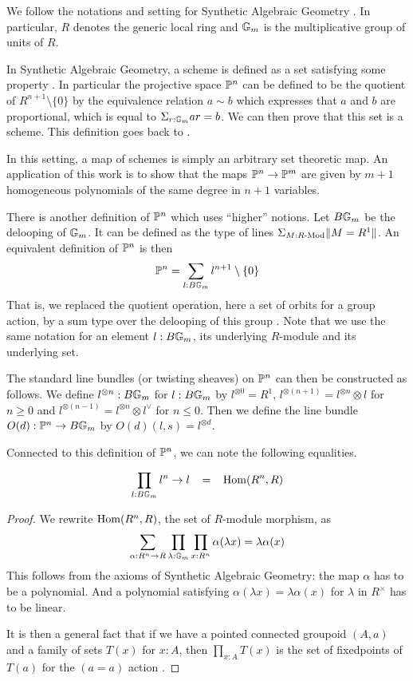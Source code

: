 We follow the notations and setting for Synthetic Algebraic Geometry \cite{draft}.
In particular, $R$ denotes the generic local ring and $\mathbb{G}_m$ is the multiplicative group of units of $R$.

In Synthetic Algebraic Geometry, a scheme is defined as a set satisfying some property \cite{draft}. In particular
the projective space $\mathbb{P}^n$ can be defined to be the quotient of $R^{n+1}\setminus\{0\}$ by the
equivalence relation $a\sim b$ which expresses that $a$ and $b$ are proportional, %
which is equal to $\Sigma_{r:\mathbb{G}_m}ar = b$. We can then prove \cite{draft}
that this set is a scheme. This definition goes back to \cite{Kock74}.

 In this setting, a map of schemes is simply an arbitrary set theoretic map. An application of this work is to show
 that the maps $\mathbb{P}^n\rightarrow \mathbb{P}^m$ are given by $m+1$ homogeneous polynomials of the same degree in $n+1$ variables.

\medskip


There is another definition of $\mathbb{P}^n$ which uses ``higher'' notions. Let $B\mathbb{G}_m$ be the delooping
of $\mathbb{G}_m$. It can be defined as the type of lines $\Sigma_{M:R\text{-}\mathrm{Mod}}\|{M=R^1}\|$.
An equivalent definition of $\mathbb{P}^n$ is then
$$
\mathbb{P}^n = \sum_{l:B\mathbb{G}_m}l^{n+1}\setminus\{0\}
$$
That is, we replaced the quotient operation, here a set of orbits for a group action, by a sum type over the delooping of this group
\cite{Sym}.
Note that we use the same notation for an element $l : B\mathbb{G}_m$,
its underlying $R$-module and its underlying set.

The standard line bundles (or twisting sheaves) on $\mathbb{P}^n$ can then be constructed as follows.
We define $l^{\otimes n}:B\mathbb{G}_m$ for $l:B\mathbb{G}_m$ by
$l^{\otimes 0} = R^1$,
$l^{\otimes (n+1)} = l^{\otimes n}\otimes l$ for $n \geqslant 0$
and $l^{\otimes (n-1)} = l^{\otimes n}\otimes l^{\vee}$ for $n \leqslant 0$.
Then we define the line bundle $O(d):\mathbb{P}^n\rightarrow B\mathbb{G}_m$ by $O(d)(l,s) = l^{\otimes d}$.

\medskip

Connected to this definition of $\mathbb{P}^n$, we can note the following equalities.

\begin{proposition}\label{end}
  $$\prod_{l:B\mathbb{G}_m}l^n\rightarrow l \;\;\;=\;\;\; \mathrm{Hom}(R^n,R)$$
\end{proposition}

\begin{proof}
We rewrite $\mathrm{Hom}(R^n,R)$, the set of $R$-module morphism, as
$$
\sum_{\alpha:R^n\rightarrow R}\prod_{\lambda:\mathbb{G}_m}\prod_{x:R^n}\alpha(\lambda x) = \lambda \alpha(x)
$$
This follows from the axioms of Synthetic Algebraic Geometry: the map $\alpha$ has to be a polynomial. And a polynomial
satisfying $\alpha(\lambda x) = \lambda \alpha(x)$ for $\lambda$ in $R^{\times}$ has to be linear.

\medskip

It is then a general fact that if we have a pointed connected groupoid $(A,a)$ and a family of
sets $T(x)$ for $x:A$, then $\prod_{x:A}T(x)$ is the set of fixedpoints of $T(a)$ for the $(a=a)$ action
\cite{Sym}.
\end{proof}

